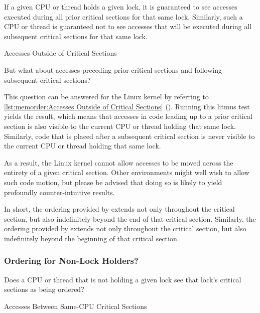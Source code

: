 If a given CPU or thread holds a given lock, it is guaranteed to see
accesses executed during all prior critical sections for that same
lock.
Similarly, such a CPU or thread is guaranteed not to see accesses
that will be executed during all subsequent critical sections for
that same lock.

\begin{listing}

\caption{Accesses Outside of Critical Sections}
\label{lst:memorder:Accesses Outside of Critical Sections}
\end{listing}

But what about accesses preceding prior critical sections and
following subsequent critical sections?

This question can be answered for the Linux kernel by referring to
\cref{lst:memorder:Accesses Outside of Critical Sections}
().
Running this litmus test yields the  result,
which means that accesses in code leading up to a prior critical section
is also visible to the current CPU or thread holding that same lock.
Similarly, code that is placed after a subsequent critical section
is never visible to the current CPU or thread holding that same lock.

As a result, the Linux kernel cannot allow accesses to be moved
across the entirety of a given critical section.
Other environments might well wish to allow such code motion, but please
be advised that doing so is likely to yield profoundly counter-intuitive
results.

In short, the ordering provided by  extends not only
throughout the critical section, but also indefinitely beyond the end
of that critical section.
Similarly, the ordering provided by  extends not
only throughout the critical section, but also indefinitely beyond the
beginning of that critical section.

\subsubsection{Ordering for Non-Lock Holders?}
\label{sec:memorder:Ordering for Non-Lock Holders?}

Does a CPU or thread that is not holding a given lock see that lock's
critical sections as being ordered?

\begin{listing}

\caption{Accesses Between Same-CPU Critical Sections}
\label{lst:memorder:Accesses Between Same-CPU Critical Sections}
\end{listing}

